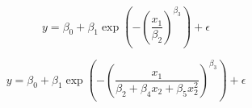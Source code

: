 \documentclass[12pt]{article}
\begin{document}
\pagestyle{empty}
\Large
{}
\pagecolor{ehandbook}

\boldmath
\[
y = \beta_0 + \beta_1\exp\left(-\left(\frac{x_1}{\beta_2}\right)^{\beta_3}\right) + \epsilon
\]

\[
y = \beta_0 + \beta_1\exp\left(-\left(\frac{x_1}{\beta_2+\beta_4x_2+\beta_5x_2^2}\right)^{\beta_3}\right) + \epsilon
\]
\end{document}
